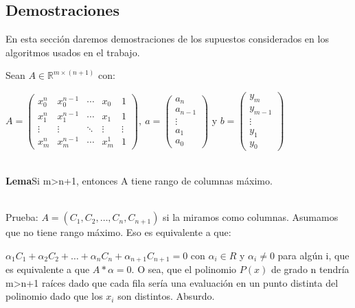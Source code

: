 \subsection{Demostraciones}

En esta sección daremos demostraciones de los supuestos considerados en los algoritmos usados en el
trabajo.

Sean $A \in \mathbb{R}^{m\times (n+1)}$ con:


  $ A = \begin{pmatrix}
    x_0^n & x_0^{n-1} & \cdots &  x_0  & 1 \\
    x_1^{n} & x_1^{n-1} & \cdots & x_1 & 1 \\
    \vdots  & \vdots  & \ddots & \vdots  & \vdots \\
    x_m^{n} & x_m^{n-1} & \cdots & x_m^1 & 1
        \end{pmatrix}, \
   a = \begin{pmatrix}
        a_n \\
        a_{n-1} \\
        \vdots \\
        a_1 \\
        a_0
       \end{pmatrix}
  $ y $
  b = \begin{pmatrix}
        y_m \\
        y_{m-1} \\
        \vdots \\
        y_1 \\
        y_0
       \end{pmatrix}
  $



\ \\
\textbf{Lema}Si m>n+1, entonces A tiene rango de columnas máximo.

\ \\
Prueba:
  $A = ( C_1, C_2, \ldots, C_n, C_{n+1} )$ si la miramos como columnas. Asumamos que no tiene rango máximo. Eso es equivalente a que:

$\alpha_1C_1+\alpha_2C_2+\hdots+\alpha_nC_n+\alpha_{n+1}C_{n+1} = 0$ con $\alpha_i \in R$ y $\alpha_i
\neq 0$ para algún i, que es equivalente a que $A * \alpha =0$. O sea, que
el polinomio $P(x)$ de grado n tendría m>n+1 raíces dado que cada fila sería una evaluación en un punto distinta del polinomio dado que los $x_i$ son distintos. Absurdo.

